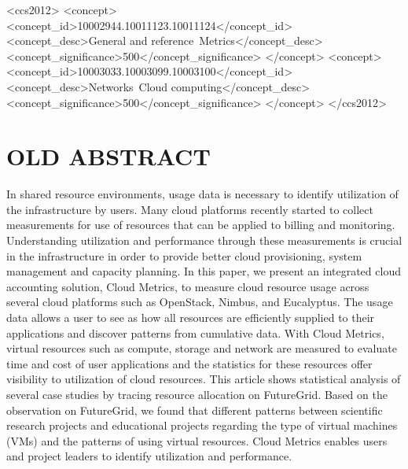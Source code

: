 \documentclass{sig-alternate-05-2015}
\begin{document}
\begin{CCSXML}
<ccs2012>
<concept>
<concept_id>10002944.10011123.10011124</concept_id>
<concept_desc>General and reference~Metrics</concept_desc>
<concept_significance>500</concept_significance>
</concept>
<concept>
<concept_id>10003033.10003099.10003100</concept_id>
<concept_desc>Networks~Cloud computing</concept_desc>
<concept_significance>500</concept_significance>
</concept>
</ccs2012>
\end{CCSXML}


\printccsdesc




\section{OLD ABSTRACT} 


In shared resource environments, usage data is necessary to identify utilization of the infrastructure by users. Many cloud platforms recently started to collect measurements for use of resources that can be applied to billing and monitoring. Understanding utilization and performance through these measurements is crucial in the infrastructure in order to provide better cloud provisioning, system management and capacity planning. In this paper, we present an integrated cloud accounting solution, Cloud Metrics, to measure cloud resource usage across several cloud platforms such as OpenStack, Nimbus, and Eucalyptus. The usage data allows a user to see as how all resources are efficiently supplied to their applications and discover patterns from cumulative data. With Cloud Metrics, virtual resources such as compute, storage and network are measured to evaluate time and cost of user applications and the statistics for these resources offer visibility to utilization of cloud resources. This article shows statistical analysis of several case studies by tracing resource allocation on FutureGrid. Based on the observation on FutureGrid, we found that different patterns between scientific research projects and educational projects regarding the type of virtual machines (VMs) and the patterns of using virtual resources. Cloud Metrics enables users and project leaders to identify utilization and performance.
\end{document}
